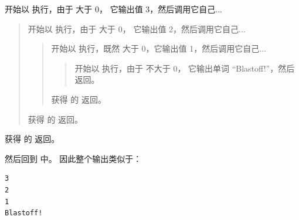 {{{{%

\newpage
{} 开始以  执行，由于  大于 0， 它输出值 3，然后调用它自己...

\begin{quote}
 开始以  执行，由于  大于 0， 它输出值 2，然后调用它自己...

\begin{quote}
 开始以  执行，既然  大于 0，它输出值 1，然后调用它自己...

\begin{quote}
 开始以  执行，由于  不大于 0， 它输出单词 ``Blastoff!''，然后返回。
\end{quote}

获得  的  返回。
\end{quote}

获得  的  返回。
\end{quote}

获得  的  返回。

\vspace{0.1 in}

然后回到  中。 因此整个输出类似于：

\begin{lstlisting}
3
2
1
Blastoff!
\end{lstlisting}

}}}}
